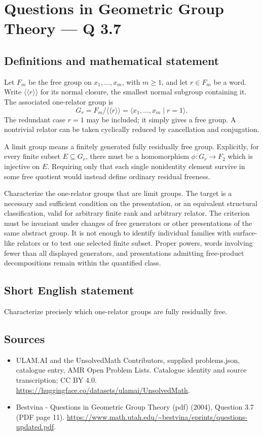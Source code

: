 \documentclass[11pt,a4paper]{article}
\begin{document}
\section*{Questions in Geometric Group Theory — Q 3.7}\label{statement}

\subsection{Definitions and mathematical statement}
Let $F_m$ be the free group on $x_1,\ldots,x_m$, with $m\geq1$, and let $r\in F_m$ be a word. Write $\langle\!\langle r\rangle\!\rangle$ for its normal closure, the smallest normal subgroup containing it. The associated one-relator group is
\[
 G_r=F_m/\langle\!\langle r\rangle\!\rangle
      =\langle x_1,\ldots,x_m\mid r=1\rangle.
\]
The redundant case $r=1$ may be included; it simply gives a free group. A nontrivial relator can be taken cyclically reduced by cancellation and conjugation.

A limit group means a finitely generated fully residually free group. Explicitly, for every finite subset $E\subseteq G_r$, there must be a homomorphism $\phi:G_r\to F_2$ which is injective on $E$. Requiring only that each single nonidentity element survive in some free quotient would instead define ordinary residual freeness.

Characterize the one-relator groups that are limit groups. The target is a necessary and sufficient condition on the presentation, or an equivalent structural classification, valid for arbitrary finite rank and arbitrary relator. The criterion must be invariant under changes of free generators or other presentations of the same abstract group. It is not enough to identify individual families with surface-like relators or to test one selected finite subset. Proper powers, words involving fewer than all displayed generators, and presentations admitting free-product decompositions remain within the quantified class.
\subsection{Short English statement}
Characterize precisely which one-relator groups are fully residually free.
\subsection{Sources}
\begin{itemize}
\item[S1] ULAM.AI and the UnsolvedMath Contributors, supplied problems.json, catalogue entry, AMR Open Problem Lists. Catalogue identity and source transcription; CC BY 4.0.
\url{https://huggingface.co/datasets/ulamai/UnsolvedMath}.
\item[S2] Bestvina - Questions in Geometric Group Theory (pdf) (2004), Question 3.7 (PDF page 11). 
\url{https://www.math.utah.edu/~bestvina/eprints/questions-updated.pdf}.
\end{itemize}
\end{document}
